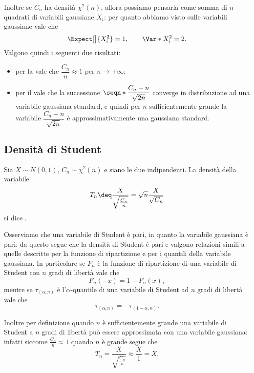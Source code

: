 Inoltre se $C_n$ ha densità $\chi^2(n)$, allora possiamo pensarla come somma di $n$ quadrati di variabili gaussiane $X_i$: per quanto abbiamo visto sulle variabili gaussiane vale che \[
    \Expect[\big]{X_i^2} = 1, \qquad \Var*{X_i^2} = 2.    
\] Valgono quindi i seguenti due risultati: \begin{itemize}
    \item per la  vale che $\dfrac{C_n}{n} \approx 1$ per $n \to +\infty$;
    \item per il  vale che la successione $\seqn*{\dfrac{C_n - n}{\sqrt{2n}}}$ converge in distribuzione ad una variabile gaussiana standard, e quindi per $n$ sufficientemente grande la variabile $\dfrac{C_n - n}{\sqrt{2n}}$ è approssimativamente una gaussiana standard.
\end{itemize}

\subsection{Densità di Student}

\begin{definition}
     Sia $X \sim N(0, 1)$, $C_n \sim \chi^2(n)$ e siano le due indipendenti. La densità della variabile \[
        T_n \deq \frac{X}{\sqrt{\frac{C_n}{n}}} = \sqrt n \frac{X}{\sqrt{C_n}} 
    \] si dice .
\end{definition}

Osserviamo che una variabile di Student è pari, in quanto la variabile gaussiana è pari: da questo segue che la densità di Student è pari e valgono relazioni simili a quelle descritte per la funzione di ripartizione e per i quantili della variabile gaussiana. In particolare se $F_n$ è la funzione di ripartizione di una variabile di Student con $n$ gradi di libertà vale che \[
    F_n(-x) = 1 - F_n(x),    
\] mentre se $\tau_{(\alpha, n)}$ è l'$\alpha$-quantile di una variabile di Student ad $n$ gradi di libertà vale che \[
    \tau_{(\alpha, n)} = -\tau_{(1-\alpha, n)}.
\]

Inoltre per definizione quando $n$ è sufficientemente grande una variabile di Student a $n$ gradi di libertà può essere approssimata con una variabile gaussiana: infatti siccome $\frac{C_n}{n} \approx 1$ quando $n$ è grande segue che \[
    T_n = \frac{X}{\sqrt{\frac{C_n}{n}}} \approx \frac{X}{1} = X.    
\]